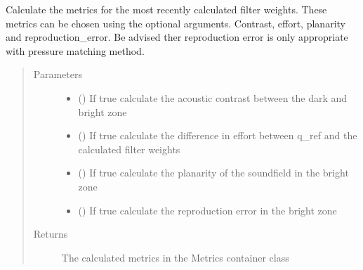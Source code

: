 \documentclass[letterpaper,10pt,english]{sphinxmanual}
\begin{document}
\begin{fulllineitems}
\begin{fulllineitems}
\label{\detokenize{source/pyzones:pyzones.Simulation.calculate_metrics}}
Calculate the metrics for the most recently calculated filter weights. These metrics can be chosen using the
optional arguments. Contrast, effort, planarity and reproduction\_error. Be advised ther reproduction error is only
appropriate with pressure matching method.
\begin{quote}\begin{description}
\item[{Parameters}] \leavevmode\begin{itemize}
\item {} 
 () \textendash{} If true calculate the acoustic contrast between the dark and bright zone

\item {} 
 () \textendash{} If true calculate the difference in effort between q\_ref and the calculated filter weights

\item {} 
 () \textendash{} If true calculate the planarity of the soundfield in the bright zone

\item {} 
 () \textendash{} If true calculate the reproduction error in the bright zone

\end{itemize}

\item[{Returns}] \leavevmode
The calculated metrics in the Metrics container class

\end{description}\end{quote}

\end{fulllineitems}



\end{fulllineitems}
\end{document}
